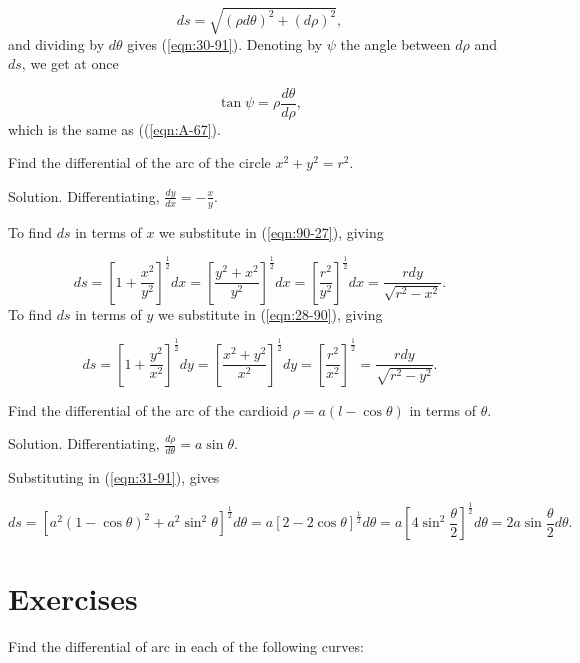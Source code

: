 \[
    ds = \sqrt{(\rho d\theta)^2 + (d\rho)^2},
\]
and dividing by $ d\theta$ gives (\ref{eqn:30-91}).
Denoting by $\psi$ the angle between $d\rho$ and 
$ds$, we get at once

\[
    \tan \psi = \rho \frac{d\theta}{d\rho},
\]
which is the same as ((\ref{eqn:A-67}). %

\begin{example}
{\rm
Find the differential of the arc of the circle $x^2 + y^2 = r^2$.

Solution. Differentiating, $\frac{dy}{dx} = -\frac{x}{y}$.

To find $ds$ in terms of $x$ we substitute in (\ref{eqn:90-27}), giving

\[
    ds 
= \left[ 1 + \frac{x^2}{y^2} \right]^{\frac{1}{2}} dx 
= \left[ \frac{y^2 + x^2}{y^2} \right]^{\frac{1}{2}} dx 
= \left[ \frac{r^2}{y^2} \right]^{\frac{1}{2}} dx 
= \frac{r dy}{\sqrt{r^2 - x^2}}.
\]
To find $ds$ in terms of $y$ we substitute in (\ref{eqn:28-90}), giving

\[
    ds 
= \left[ 1 + \frac{y^2}{x^2} \right]^{\frac{1}{2}} dy 
= \left[ \frac{x^2 + y^2}{x^2} \right]^{\frac{1}{2}} dy 
= \left[ \frac{r^2}{x^2} \right]^{\frac{1}{2}} 
= \frac{r dy}{\sqrt{r^2 - y^2}}. 
\]
}
\end{example}


\begin{example}
{\rm
Find the differential of the arc of the cardioid 
$\rho = a(l -\cos\theta)$ in terms of $\theta$.

Solution. Differentiating, $\frac{d\rho}{d\theta} = a \sin \theta$.

Substituting in (\ref{eqn:31-91}), gives

\[
ds 
= [ a^2(1 - \cos \theta)^2+ a^2 \sin^2 \theta ]^{\frac{1}{2}} d\theta 
= a [2 - 2\cos \theta]^{\frac{1}{2}} d\theta 
= a \left [ 4 \sin^2 \frac{\theta}{2} \right ]^{\frac{1}{2}} d\theta 
= 2a \sin \frac{\theta}{2} d\theta.
\]
}
\end{example}

\section{Exercises}

Find the differential of arc in each of the following curves:

